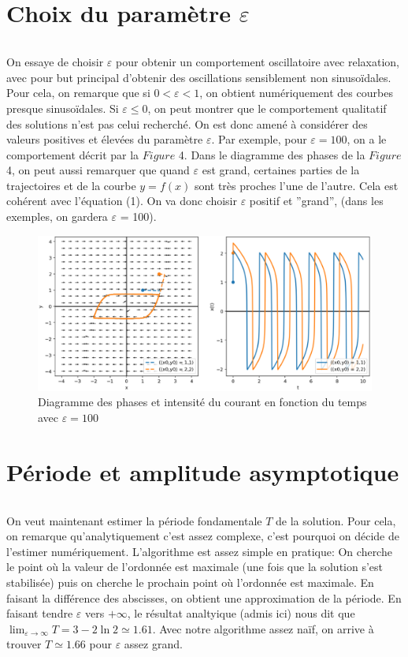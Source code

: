 \documentclass{article}
\begin{document}
\newpage
\section{Choix du paramètre $\varepsilon$}

\[\]

On essaye de choisir $\varepsilon$ pour obtenir un comportement oscillatoire avec relaxation, avec pour
but principal d’obtenir des oscillations sensiblement non sinusoïdales. Pour cela, on remarque
que si $0 <\varepsilon < 1$, on obtient numériquement des courbes presque sinusoïdales. Si
$\varepsilon \leq 0$, on peut
montrer que le comportement qualitatif des solutions n’est pas celui recherché.
On est donc amené à considérer des valeurs positives et élevées du paramètre $\varepsilon$. 
Par exemple, pour $\varepsilon = 100$, on a le comportement décrit par la $Figure$ 4.
Dans le diagramme des phases de la $Figure$ 4, on peut aussi remarquer que quand $\varepsilon$ est grand,
certaines parties de la trajectoires et de la courbe $y = f (x)$ sont très proches l’une de l’autre.
Cela est cohérent avec l’équation (1). On va donc choisir $\varepsilon$ positif et ”grand”, (dans les exemples, on gardera
$\varepsilon$ = 100).

\begin{figure}[!h]
    \centering
    \includegraphics[scale=0.4]{../images/epsilon_choice.png}
    \captionsetup{justification=centering,margin=2cm}
    \caption{Diagramme des phases et intensité du courant en fonction du temps avec $\varepsilon = 100$}
\end{figure}

\section{Période et amplitude asymptotique}

\[\]

On veut maintenant estimer la période fondamentale $T$ de la solution. Pour cela, on remarque qu'analytiquement c'est assez complexe, c'est pourquoi on décide de l'estimer numériquement.
L'algorithme est assez simple en pratique: On cherche le point où la valeur de l'ordonnée est maximale (une fois que la solution s'est stabilisée) puis on cherche le prochain point où l'ordonnée est maximale.
En faisant la différence des abscisses, on obtient une approximation de la période.
En faisant tendre $\varepsilon$ vers $+\infty $, le résultat analtyique (admis ici) nous dit que $\lim_{\varepsilon \to \infty} T = 3 - 2\ln 2 \simeq 1.61$.
Avec notre algorithme assez naïf, on arrive à trouver $T \simeq 1.66$ pour $\varepsilon$ assez grand.
\end{document}
